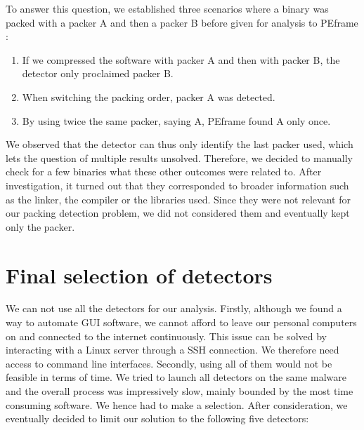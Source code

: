 To answer this question, we established three scenarios where a binary was packed with a packer A and then a packer B before given for analysis to PEframe :
\begin{enumerate}
    \item If we compressed the software with packer A and then with packer B, the detector only proclaimed packer B.
    \item When switching the packing order, packer A was detected.
    \item By using twice the same packer, saying A, PEframe found A only once.
\end{enumerate}

We observed that the detector can thus only identify the last packer used, which lets the question of multiple results unsolved. Therefore, we decided to manually check for a few binaries what these other outcomes were related to. After investigation, it turned out that they corresponded to broader information such as the linker, the compiler or the libraries used. Since they were not relevant for our packing detection problem, we did not considered them and eventually kept only the packer.

\section{Final selection of detectors}

We can not use all the detectors for our analysis. Firstly, although we found a way to automate GUI software, we cannot afford to leave our personal computers on and connected to the internet continuously. This issue can be solved by interacting with a Linux server through a SSH connection. We therefore need access to command line interfaces. Secondly, using all of them would not be feasible in terms of time. We tried to launch all detectors on the same malware and the overall process was impressively slow, mainly bounded by the most time consuming software. We hence had to make a selection. After consideration, we eventually decided to limit our solution to the following five detectors: 


